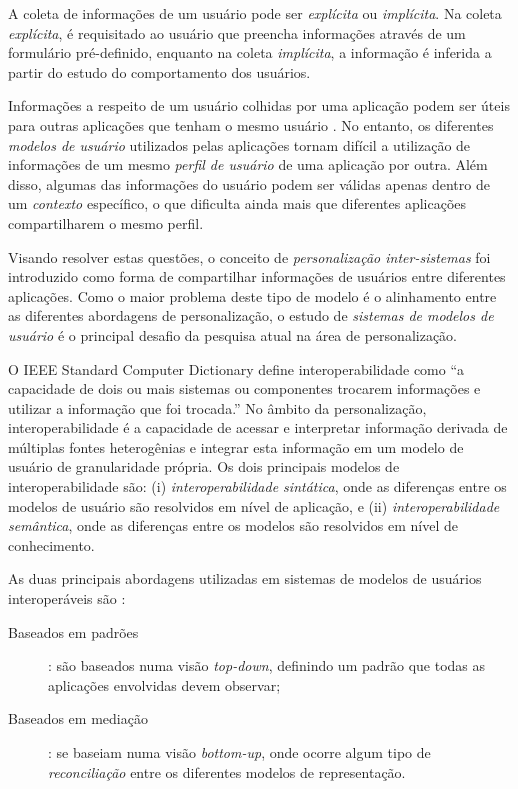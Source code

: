 A coleta de informações de um usuário pode ser \emph{explícita} ou \emph{implícita}\cite{viviani10}. Na coleta \emph{explícita}, é requisitado ao usuário que preencha informações através de um formulário pré-definido, enquanto na coleta \emph{implícita}, a informação é inferida a partir do estudo do comportamento dos usuários.

Informações a respeito de um usuário colhidas por uma aplicação podem ser úteis para outras aplicações que tenham o mesmo usuário \cite{viviani10}. No entanto, os diferentes \emph{modelos de usuário} utilizados pelas aplicações tornam difícil a utilização de informações de um mesmo \emph{perfil de usuário} de uma aplicação por outra. Além disso, algumas das informações do usuário podem ser válidas apenas dentro de um \emph{contexto} específico, o que dificulta ainda mais que diferentes aplicações compartilharem o mesmo perfil.

Visando resolver estas questões, o conceito de \emph{personalização inter-sistemas} foi introduzido \cite{niederee04} como forma de compartilhar informações de usuários entre diferentes aplicações. Como o maior problema deste tipo de modelo é o alinhamento entre as diferentes abordagens de personalização, o estudo de \emph{sistemas de modelos de usuário} é o principal desafio da pesquisa atual na área de personalização.\cite{viviani10}

O IEEE Standard Computer Dictionary \cite{ieeedict} define interoperabilidade como ``a capacidade de dois ou mais sistemas ou componentes trocarem informações e utilizar a informação que foi trocada.'' No âmbito da personalização, interoperabilidade é a capacidade de acessar e interpretar informação derivada de múltiplas fontes heterogênias e integrar esta informação em um modelo de usuário de granularidade própria\cite{carmagnola09}. Os dois principais modelos de interoperabilidade são: (i) \emph{interoperabilidade sintática}, onde as diferenças entre os modelos de usuário são resolvidos em nível de aplicação, e (ii) \emph{interoperabilidade semântica}, onde as diferenças entre os modelos são resolvidos em nível de conhecimento.

As duas principais abordagens utilizadas em sistemas de modelos de usuários interoperáveis são \cite{viviani10}:

\begin{description}

  \item[Baseados em padrões]: são baseados numa visão \emph{top-down}, definindo um padrão que todas as aplicações envolvidas devem observar;
  \item[Baseados em mediação]: se baseiam numa visão \emph{bottom-up}, onde ocorre algum tipo de \emph{reconciliação} entre os diferentes modelos de representação.

\end{description}


%


